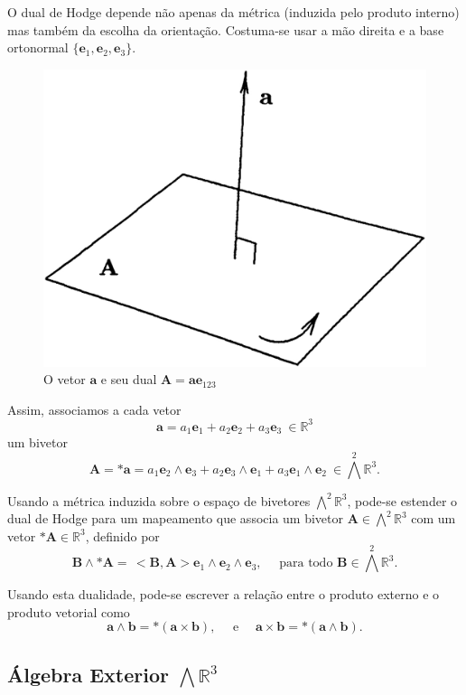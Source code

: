 \documentclass[a4paper,12pt]{report}
\theoremstyle{plain}
\theoremstyle{definition}
\begin{document}
	O dual de Hodge depende não apenas da métrica (induzida pelo produto interno) mas também da escolha da orientação. Costuma-se usar a mão direita e a base ortonormal $\{\mathbf e_1,\mathbf e_2,\mathbf e_3\}$.
	
	\begin{figure}[H]
		\begin{center}
			\includegraphics[width=0.4\linewidth]{figures/dual.jpg}
		\end{center}
		\caption{O vetor $\mathbf a$ e seu dual $\mathbf A = \mathbf a\mathbf e_{123}$}
		\label{fig:lable}
	\end{figure}
	
	Assim, associamos a cada vetor $$\mathbf a = a_1\mathbf e_1+a_2\mathbf e_2 + a_3 \mathbf e_3\ \in \mathbb{R}^3$$ um bivetor $$\mathbf A = *\mathbf a = a_1\mathbf e_2\wedge\mathbf e_3 + a_2 \mathbf e_3\wedge\mathbf e_1 + a_3 \mathbf e_1\wedge\mathbf e_2\ \in \bigwedge^2\mathbb{R}^3.$$
	
	Usando a métrica induzida sobre o espaço de bivetores $\bigwedge^2\mathbb{R}^3$, pode-se estender o dual de Hodge para um mapeamento que associa um bivetor $\mathbf A\in \bigwedge^2\mathbb{R}^3$ com um vetor $*\mathbf A\in \mathbb{R}^3$, definido por $$\mathbf B \wedge*\mathbf A =\, <\mathbf B, \mathbf A>\mathbf e_1\wedge \mathbf e_2 \wedge\mathbf e_3, \quad \text{ para todo } \mathbf B\in \bigwedge^2\mathbb{R}^3.$$
	
	Usando esta dualidade, pode-se escrever a relação entre o produto externo e o produto vetorial como $$\mathbf a\wedge\mathbf b = *(\mathbf a\times \mathbf b), \quad \text{ e }\quad \mathbf a\times \mathbf b = *(\mathbf a\wedge\mathbf b).$$
	 
	\subsection{Álgebra Exterior $\bigwedge\mathbb{R}^3$}
	
\end{document}
